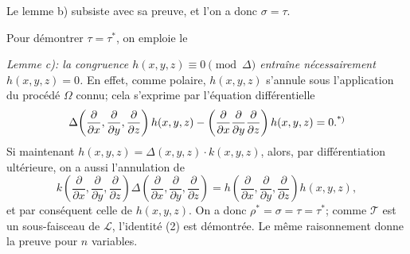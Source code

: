 Le lemme b) subsiste avec sa preuve, et l'on a donc $\sigma=\tau$.

Pour démontrer $\tau=\tau^*$, on emploie le

\emph{Lemme c): la congruence $h(x,y,z)\equiv0\pmod{\Delta}$ entraîne nécessairement $h(x,y,z)=0$.} En effet, comme polaire, $h(x,y,z)$ s'annule sous l'application du procédé $\Omega$ connu; cela s'exprime par l'équation différentielle
\[
  \Delta\!\left(\frac{\partial}{\partial x},\frac{\partial}{\partial y},\frac{\partial}{\partial z}\right)h(x,y,z)
  -\left(\frac{\partial}{\partial x}\frac{\partial}{\partial y}\frac{\partial}{\partial z}\right)h(x,y,z)=0.\srcfnmark{*)}
\]
Si maintenant $h(x,y,z)=\Delta(x,y,z)\cdot k(x,y,z)$, alors, par différentiation ultérieure, on a aussi l'annulation de
\[
  k\!\left(\frac{\partial}{\partial x},\frac{\partial}{\partial y},\frac{\partial}{\partial z}\right)
  \Delta\!\left(\frac{\partial}{\partial x},\frac{\partial}{\partial y},\frac{\partial}{\partial z}\right)
  =
  h\!\left(\frac{\partial}{\partial x},\frac{\partial}{\partial y},\frac{\partial}{\partial z}\right)h(x,y,z),
\]
et par conséquent celle de $h(x,y,z)$. On a donc $\rho^*=\sigma=\tau=\tau^*$; comme $\mathcal T$ est un sous-faisceau de $\mathcal L$, l'identité (2) est démontrée. Le même raisonnement donne la preuve pour $n$ variables.

